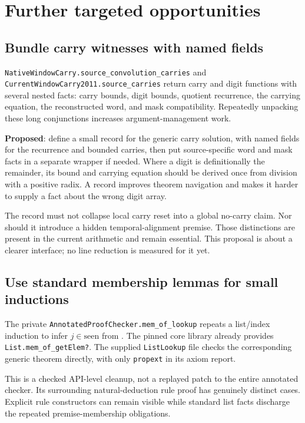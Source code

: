 \documentclass[11pt,letterpaper]{article}
\newcommand{\code}[1]{\nolinkurl{#1}}
\newcommand{\proposed}{\textbf{Proposed}}
\begin{document}
\section{Further targeted opportunities}

\subsection{Bundle carry witnesses with named fields}

\code{NativeWindowCarry.source_convolution_carries} and
\code{CurrentWindowCarry2011.source_carries} return carry and digit functions
with several nested facts: carry bounds, digit bounds, quotient recurrence,
the carrying equation, the reconstructed word, and mask compatibility.
Repeatedly unpacking these long conjunctions increases argument-management work.

\proposed: define a small record for the generic carry solution, with named
fields for the recurrence and bounded carries, then put source-specific word
and mask facts in a separate wrapper if needed. Where a digit is definitionally
the remainder, its bound and carrying equation should be derived once from
division with a positive radix. A record improves theorem navigation and makes
it harder to supply a fact about the wrong digit array.

The record must not collapse local carry reset into a global no-carry claim.
Nor should it introduce a hidden temporal-alignment premise. Those distinctions
are present in the current arithmetic and remain essential. This proposal is
about a clearer interface; no line reduction is measured for it yet.

\subsection{Use standard membership lemmas for small inductions}

The private \code{AnnotatedProofChecker.mem_of_lookup} repeats a list/index
induction to infer $j\in\mathrm{seen}$ from
\texttt{}. The pinned core library already provides
\code{List.mem_of_getElem?}. The supplied \code{ListLookup} file checks the
corresponding generic theorem directly, with only \code{propext} in its axiom report.

This is a checked API-level cleanup, not a replayed patch to the entire annotated
checker. Its surrounding natural-deduction rule proof has genuinely distinct
cases. Explicit rule constructors can remain visible while standard list facts
discharge the repeated premise-membership obligations.
\end{document}
